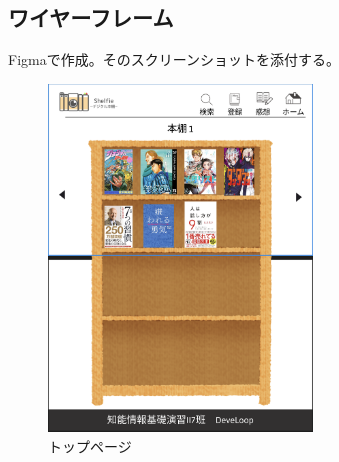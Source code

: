 \documentclass[a4paper, 11pt, titlepage]{jsarticle}
\begin{document}
\subsection{ワイヤーフレーム}
Figmaで作成。そのスクリーンショットを添付する。

\begin{figure}[htbp]
\centering
\includegraphics[width=70mm]{toppage.png}
\caption{トップページ}
\label{fig:func}
\end{figure}
\end{document}
